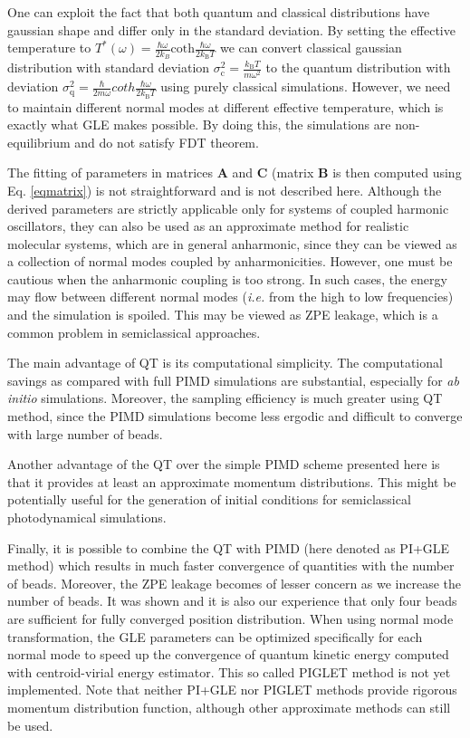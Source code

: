 \documentclass[12pt,a4paper]{article}
\begin{document}
One can exploit the fact that both quantum and classical distributions have gaussian shape and differ only in the standard deviation. By setting the effective temperature to $T^*(\omega)=\frac{\hbar\omega}{2k_B}\mathrm{coth}\frac{\hbar\omega}{2k_\mathrm{B}T} $ we can convert classical gaussian distribution with standard deviation $\sigma^2_\mathrm{c}=\frac{k_\mathrm{B} T}{m\omega^2}$ to the quantum distribution with deviation $\sigma^2_\mathrm{q}=\frac{\hbar}{2m\omega}coth\frac{\hbar\omega}{2k_\mathrm{B}T}$  using purely classical simulations. However, we need to maintain different normal modes at different effective temperature, which is exactly what GLE makes possible. By doing this, the simulations are non-equilibrium and do not satisfy FDT theorem.

The fitting of parameters in matrices $\mathbf{A}$ and $\mathbf{C}$ (matrix $\mathbf{B}$ is then computed using Eq. \ref{eqmatrix}) is not straightforward and is not described here. Although the derived parameters are strictly applicable only for systems of coupled harmonic oscillators, they can also be used as an approximate method for realistic molecular systems, which are in general anharmonic, since they can be viewed as a collection of normal modes coupled by anharmonicities. 
However, one must be cautious when the anharmonic coupling is too strong. In such cases, the energy may flow between different normal modes (\textit{i.e.} from the high to low frequencies) and the simulation is spoiled. This may be viewed as ZPE leakage, which is a common problem in semiclassical approaches.

The main advantage of QT is its computational simplicity. The computational savings as compared with full PIMD simulations are substantial, especially for \textit{ab initio} simulations. Moreover, the sampling efficiency is much greater using QT method, since the PIMD simulations become less ergodic and difficult to converge with large number of beads.

Another advantage of the QT over the simple PIMD scheme presented here is that it provides at least an approximate momentum distributions. This might be potentially useful for the generation of initial conditions for semiclassical photodynamical simulations.

Finally, it is possible to combine the QT with PIMD (here denoted as PI+GLE method)\cite{Ceriotti2011} which results in much faster convergence of quantities with the number of beads. Moreover, the ZPE leakage becomes of lesser concern as we increase the number of beads.
It was shown\cite{Ceriotti2011} and it is also our experience that only four beads are sufficient for fully converged position distribution. 
When using normal mode transformation, the GLE parameters can be optimized specifically for each normal mode to speed up the convergence of quantum kinetic energy computed with centroid-virial energy estimator\cite{Ceriotti2012}. This so called PIGLET method is not yet implemented. 
Note that neither PI+GLE nor PIGLET methods provide rigorous momentum distribution function, although other approximate methods can still be used\cite{Ceriotti2012}.
\end{document}
